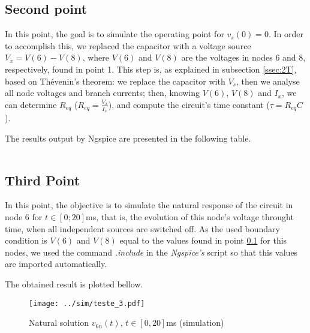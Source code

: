 \subsection{Second point}
\label{ssec:2S}

\par In this point, the goal is to simulate the operating point for $v_s(0)=0$. In order to accomplish this, we replaced the capacitor with a voltage source $V_x=V(6)-V(8)$, where $V(6)$ and $V(8)$ are the voltages in nodes 6 and 8, respectively, found in point 1. This step is, as explained in subsection \ref{ssec:2T}, based on Thévenin's theorem: we replace the capacitor with $V_s$, then we analyse all node voltages and branch currents; then, knowing $V(6)$, $V(8)$ and $I_x$, we can determine $R_{eq}$ ($R_{eq}=\frac{V_x}{I_x}$), and compute the circuit's time constant ($\tau = R_{eq}C$).
\par The results output by Ngspice are presented in the following table.

\vspace{5mm}
\begin{table}[h!]
\centering
\begin{tabularx}{0.6\textwidth} {
  | >{\raggedright\arraybackslash}X
  | >{\raggedleft\arraybackslash}X | }
 \hline

\end{tabularx}
\end{table}

\newpage
\subsection{Third Point}
\label{ssec:3S}

\par In this point, the objective is to simulate the natural response of the circuit in node 6 for $t \in[0;20]$ms, that is, the evolution of this node's voltage throught time, when all independent sources are switched off. As the used boundary condition is $V(6)$ and $V(8)$ equal to the values found in point \ref{ssec:2S} for this nodes, we used the command \textit{.include} in the \textit{Ngspice's} script so that this values are imported automatically.
\par The obtained result is plotted bellow.

\begin{figure}[h!] \centering
\texttt{[image: ../sim/teste\_3.pdf]}
\caption{Natural solution $v_{6n}(t)$, $t\in[0,20]$ms (simulation)}
\label{fig:snat_sim}
\end{figure}
